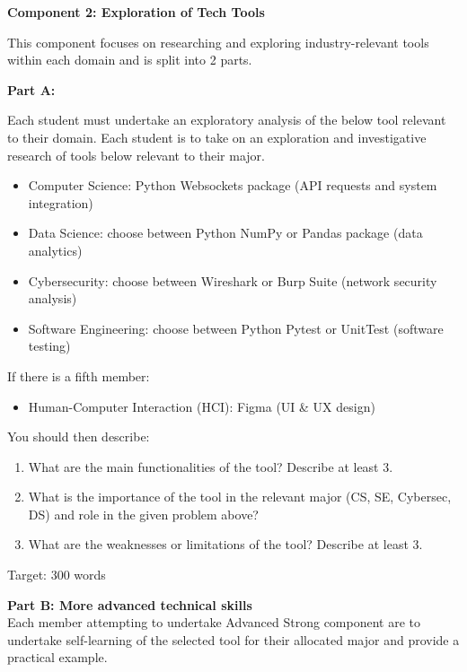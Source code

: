 \documentclass[a4paper, 11pt]{report}
\begin{document}
\vspace{4ex}

\textbf{Component 2: Exploration of Tech Tools}

This component focuses on researching and exploring industry-relevant tools within each domain and is split into 2 parts.

\vspace{2ex}


\textbf{Part A:}

Each student must undertake an exploratory analysis of the below tool relevant to their domain. 
Each student is to take on an exploration and investigative research of tools below relevant to their major. 

\begin{itemize}
    \item Computer Science: Python Websockets package (API requests and system integration)
    \item Data Science: choose between Python NumPy or Pandas package (data analytics)
    \item Cybersecurity: choose between Wireshark or Burp Suite (network security analysis)
    \item Software Engineering: choose between Python Pytest or UnitTest (software testing)
\end{itemize}
If there is a fifth member:
\begin{itemize}
    \item Human-Computer Interaction (HCI): Figma (UI \& UX design)
\end{itemize}

\vspace{4ex}

You should then describe:
\begin{enumerate}
    \item What are the main functionalities of the tool? Describe at least 3.
    \item What is the importance of the tool in the relevant major (CS, SE, Cybersec, DS) and role in the given problem above?
    \item What are the weaknesses or limitations of the tool? Describe at least 3.
\end{enumerate}
Target: 300 words

\vspace{4ex}

\textbf{Part B: More advanced technical skills}\\

Each member attempting to undertake Advanced Strong component are to undertake self-learning of the selected tool for their allocated major and provide a practical example.
\end{document}
